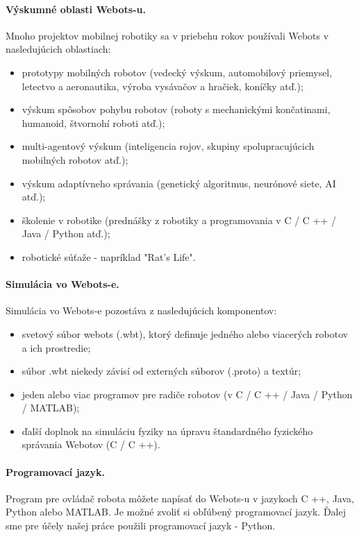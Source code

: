 \paragraph{Výskumné oblasti Webots-u.}
Mnoho projektov mobilnej robotiky sa v priebehu rokov používali Webots v nasledujúcich oblastiach:
\begin{itemize}
    \item prototypy mobilných robotov (vedecký výskum, automobilový priemysel, letectvo a aeronautika, výroba vysávačov a hračiek, koníčky atď.);
    \item výskum spôsobov pohybu robotov (roboty s mechanickými končatinami, humanoid, štvornohí roboti atď.);
    \item multi-agentový výskum (inteligencia rojov, skupiny spolupracujúcich mobilných robotov atď.);
    \item výskum adaptívneho správania (genetický algoritmus, neurónové siete, AI atď.);
    \item školenie v robotike (prednášky z robotiky a programovania v C / C ++ / Java / Python atď.);
    \item robotické súťaže - napríklad "Rat's Life". 
\end{itemize}

\paragraph{Simulácia vo Webots-e.}
Simulácia vo Webots-e pozostáva z nasledujúcich komponentov:
\begin{itemize}
    \item svetový súbor webots (.wbt), ktorý definuje jedného alebo viacerých robotov a ich prostredie;
    \item súbor .wbt niekedy závisí od externých súborov (.proto) a textúr;
    \item jeden alebo viac programov pre radiče robotov (v C / C ++ / Java / Python / MATLAB);
    \item ďalší doplnok na simuláciu fyziky na úpravu štandardného fyzického správania Webotov (C / C ++). 
\end{itemize}

\paragraph{Programovací jazyk.}
Program pre ovládač robota môžete napísať do Webots-u v jazykoch C ++, Java, Python alebo MATLAB. Je možné zvoliť si obľúbený programovací jazyk. Ďalej sme pre účely našej práce použili programovací jazyk - Python.
\vspace{3mm}

